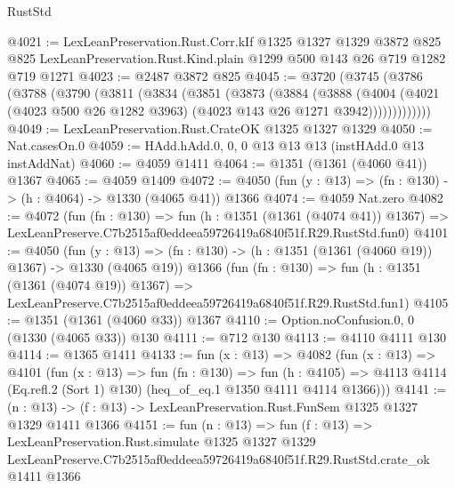 \begin{lexlean}{RustStd}
\begin{coremodule}
@4021 := LexLeanPreservation.Rust.Corr.kIf
    @1325
    @1327
    @1329
    @3872
    @825
    @825
    LexLeanPreservation.Rust.Kind.plain
    @1299
    @500
    @143
    @26
    @719
    @1282
    @719
    @1271
@4023 := @2487 @3872 @825
@4045 := @3720
    (@3745
      (@3786
        (@3788
          (@3790
            (@3811
              (@3834
                (@3851
                  (@3873
                    (@3884
                      (@3888
                        (@4004
                          (@4021
                            (@4023 @500 @26 @1282 @3963)
                            (@4023 @143 @26 @1271 @3942)))))))))))))
@4049 := LexLeanPreservation.Rust.CrateOK @1325 @1327 @1329
@4050 := Nat.casesOn.{0}
@4059 := HAdd.hAdd.{0, 0, 0} @13 @13 @13 (instHAdd.{0} @13 instAddNat)
@4060 := @4059 @1411
@4064 := @1351 (@1361 (@4060 @41)) @1367
@4065 := @4059 @1409
@4072 := @4050 (fun (y : @13) => (fn : @130) -> (h : @4064) -> @1330 (@4065 @41)) @1366
@4074 := @4059 Nat.zero
@4082 := @4072
    (fun (fn : @130) =>
    fun (h : @1351 (@1361 (@4074 @41)) @1367) =>
    LexLeanPreserve.C7b2515af0eddeea59726419a6840f51f.R29.RustStd.fun0)
@4101 := @4050
    (fun (y : @13) => (fn : @130) -> (h : @1351 (@1361 (@4060 @19)) @1367) -> @1330 (@4065 @19))
    @1366
    (fun (fn : @130) =>
    fun (h : @1351 (@1361 (@4074 @19)) @1367) =>
    LexLeanPreserve.C7b2515af0eddeea59726419a6840f51f.R29.RustStd.fun1)
@4105 := @1351 (@1361 (@4060 @33)) @1367
@4110 := Option.noConfusion.{0, 0} (@1330 (@4065 @33)) @130
@4111 := @712 @130
@4113 := @4110 @4111 @130
@4114 := @1365 @1411
@4133 := fun (x : @13) =>
  @4082
    (fun (x : @13) =>
    @4101
      (fun (x : @13) =>
      fun (fn : @130) =>
      fun (h : @4105) =>
      @4113 @4114 (Eq.refl.{2} (Sort 1) @130) (heq_of_eq.{1} @1350 @4111 @4114 @1366)))
@4141 := (n : @13) -> (f : @13) -> LexLeanPreservation.Rust.FunSem @1325 @1327 @1329 @1411 @1366
@4151 := fun (n : @13) =>
  fun (f : @13) =>
  LexLeanPreservation.Rust.simulate
    @1325
    @1327
    @1329
    LexLeanPreserve.C7b2515af0eddeea59726419a6840f51f.R29.RustStd.crate_ok
    @1411
    @1366
\end{coremodule}
\end{lexlean}
